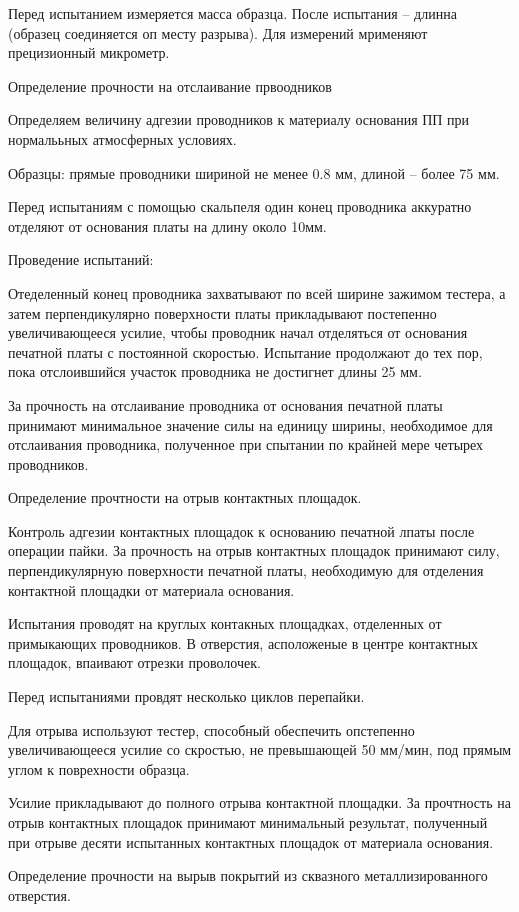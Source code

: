 \documentclass{article}
\begin{document}
Перед испытанием измеряется масса образца. После испытания -- длинна (образец соединяется оп месту разрыва). Для измерений мрименяют прецизионный микрометр.

Определение прочности на отслаивание првоодников

Определяем величину адгезии проводников к материалу основания ПП при нормалььных атмосферных условиях.

Образцы: прямые проводники шириной не менее 0.8 мм, длиной -- более 75 мм.

Перед испытаниям с помощью скальпеля один конец проводника аккуратно отделяют от основания платы на длину около 10мм.

Проведение испытаний:

Отеделенный конец проводника захватывают по всей ширине зажимом тестера, а затем перпендикулярно поверхности платы прикладывают постепенно увеличивающееся усилие, чтобы проводник начал отделяться от основания печатной платы с постоянной скоростью. Испытание продолжают до тех пор, пока отслоившийся участок проводника не достигнет длины 25 мм.

За прочность на отслаивание проводника от основания печатной платы принимают минимальное значение силы на единицу ширины, необходимое для отслаивания проводника, полученное при спытании по крайней мере четырех проводников.

Определение прочтности на отрыв контактных площадок.

Контроль адгезии контактных площадок к основанию печатной лпаты после операции пайки. За прочность на отрыв контактных площадок принимают силу, перпендикулярную поверхности печатной платы, необходимую для отделения контактной площадки от материала основания.

Испытания проводят на круглых контакных площадках, отделенных от примыкающих проводников. В отверстия, асположеные в центре контактных площадок, впаивают отрезки проволочек.

Перед испытаниями провдят несколько циклов перепайки.

Для отрыва используют тестер, способный обеспечить опстепенно увеличивающееся усилие со скростью, не превышающей 50 мм/мин, под прямым углом к поврехности образца.

Усилие прикладывают до полного отрыва контактной площадки. За прочтность на отрыв контактных площадок принимают минимальный результат, полученный при отрыве десяти испытанных контактных площадок от материала основания.

Определение прочности на вырыв покрытий из сквазного металлизированного отверстия.
\end{document}
